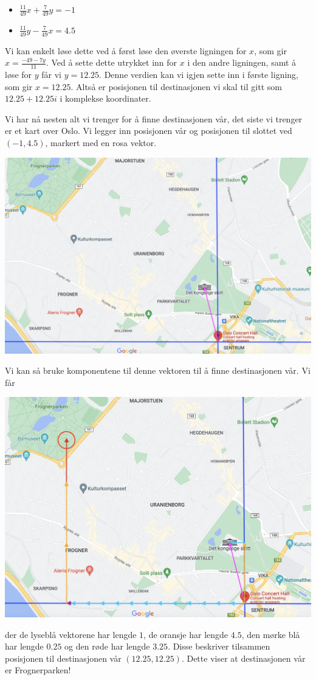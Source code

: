 \begin{itemize}
    \item $\frac{11}{49}x+\frac{7}{49}y = -1$
    \item $\frac{11}{49}y-\frac{7}{49}x = 4.5$
\end{itemize}

Vi kan enkelt løse dette ved å først løse den øverste ligningen for $x$, som gir $x=\frac{-49-7y}{11}$. Ved å sette dette utrykket inn for $x$ i den andre ligningen, samt å løse for $y$ får vi $y=12.25$. Denne verdien kan vi igjen sette inn i første ligning, som gir $x = 12.25$. Altså er posisjonen til destinasjonen vi skal til gitt som $12.25 + 12.25i$ i komplekse koordinater. 

Vi har nå nesten alt vi trenger for å finne destinasjonen vår, det siste vi trenger er et kart over Oslo. Vi legger inn posisjonen vår og posisjonen til slottet ved $(-1,4.5)$, markert med en rosa vektor. 

\begin{center}
    \includegraphics[width=\textwidth]{img/frogner.png}
\end{center}

Vi kan så bruke komponentene til denne vektoren til å finne destinasjonen vår. Vi får

\begin{center}
    \includegraphics[width=\textwidth]{img/frogner_vec.png}
\end{center}

der de lyseblå vektorene har lengde $1$, de oransje har lengde $4.5$, den mørke blå har lengde $0.25$ og den røde har lengde $3.25$. Disse beskriver tilsammen posisjonen til destinasjonen vår $(12.25, 12.25)$. Dette viser at destinasjonen vår er Frognerparken!

